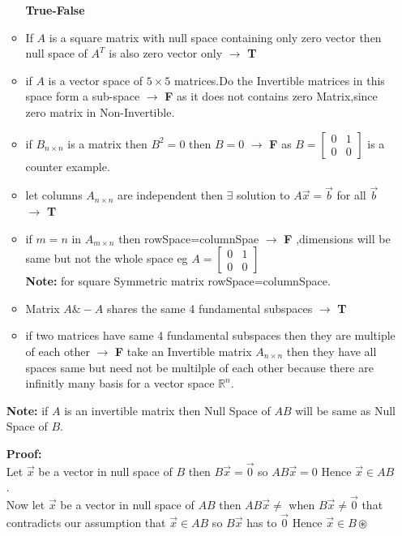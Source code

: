 \documentclass[a4paper,11pt]{article}
\numberwithin{equation}{section}
\begin{document}
\begin{itemize}
\begin{itemize}
    \textbf{True-False} 
    \item If $A$ is a square matrix with null space containing only zero vector then null space of $A^T$ is also zero vector only $\rightarrow$ \textbf{T}
    \item if $A$ is a vector space of $5\times 5$ matrices.Do the Invertible matrices in this space form a sub-space $\rightarrow$ \textbf{F} as it does not contains zero Matrix,since zero matrix in Non-Invertible.
    \item if $B_{n\times n}$ is a matrix then $B^2=0$ then $B=0$ $\rightarrow$ \textbf{F} as $B=\begin{bmatrix} 0&1\\0&0 \end{bmatrix}$ is a counter example.
    \item let columns $A_{n\times n}$ are independent then $\exists$ solution to $A\vec{x}=\vec{b}$ for all $\vec{b}$ $\rightarrow$ \textbf{T}
    \item if $m=n$ in $A_{m\times n}$ then rowSpace=columnSpae $\rightarrow$ \textbf{F} ,dimensions will be same but not the whole space eg $A=\begin{bmatrix} 0&1\\0&0 \end{bmatrix}$ \\
    \textbf{Note: }for square Symmetric matrix rowSpace=columnSpace.
    \item Matrix $A\&-A$ shares the same 4 fundamental subspaces $\rightarrow$ \textbf{T}
    \item if two matrices have same 4 fundamental subspaces then they are multiple of each other $\rightarrow$ \textbf{F} take an Invertible matrix $A_{n\times n}$ then they have all spaces same but need not be multilple of each other because there are infinitly many basis for a vector space $\mathbb{R}^n$.

\end{itemize}
\textbf{Note: }if $A$ is an invertible matrix then Null Space of $AB$ will be same as Null Space of $B$.
\begin{center}
    \textbf{Proof:} \\
    Let $\vec{x}$ be a vector in null space of $B$ then $B\vec{x}=\vec{0}$ so $AB\vec{x}=0$ Hence $\vec{x} \in AB$.\\ Now let $\vec{x}$ be a vector in null space of $AB$ then $AB\vec{x}\neq$ when $B\vec{x} \neq \vec{0}$ that contradicts our assumption that $\vec{x} \in AB$ so $B\vec{x}$ has to $\vec{0}$ Hence $\vec{x} \in B\circledast $
\end{center}


\end{itemize}
\end{document}
